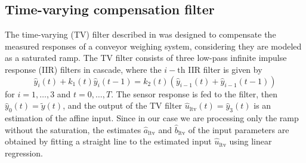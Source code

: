 \subsection{Time-varying compensation filter}

The time-varying (TV) filter described in \citep{Pietrzak14} was designed to compensate the measured responses of a conveyor weighing system, considering they are modeled as a saturated ramp.
The TV filter consists of three low-pass infinite impulse response (IIR) filters in cascade, where the $i-\mathrm{th}$ IIR filter is given by
\begin{equation} \widehat{y}_i(t) + k_1(t) \widehat{y}_i(t-1) = k_2(t) \left( \widehat{y}_{i-1}(t) + \widehat{y}_{i-1}(t-1) \right) \end{equation}
for $i = 1,\ldots,3$ and $t=0,\ldots,T$.
The sensor response is fed to the filter, then $\widehat{y}_0(t) = \widetilde{y}(t)$, and the output of the TV filter $\widehat{u}_\mathrm{ltv}(t) = \widehat{y}_3(t)$ is an estimation of the affine input.
Since in our case we are processing only the ramp without the saturation, the estimates $\widehat{a}_\mathrm{ltv}$ and $\widehat{b}_\mathrm{ltv}$ of the input parameters are obtained by fitting a straight line to the estimated input $\widehat{u}_\mathrm{ltv}$ using linear regression.

